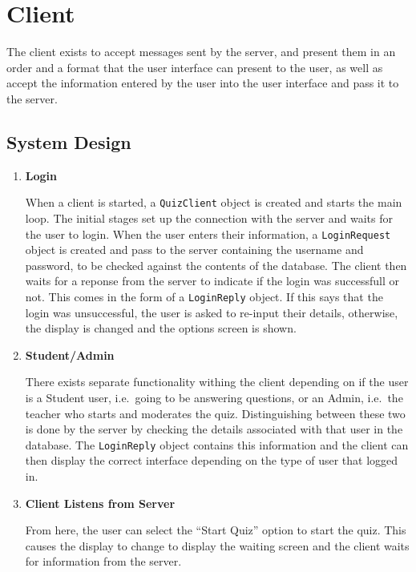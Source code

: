 \section{Client}
\label{sec:client}

The client exists to accept messages sent by the server, and present them in an
order and a format that the user interface can present to the user, as well as
accept the information entered by the user into the user interface and pass it
to the server.

\subsection{System Design}
\label{sub:client_system_design}

\begin{enumerate}

	\item \textbf{Login}

	When a client is started, a \texttt{QuizClient} object is created and
	starts the main loop.  The initial stages set up the connection with the
	server and waits for the user to login. When the user enters their
	information, a \texttt{LoginRequest} object is created and pass to the
	server containing the username and password, to be checked against the
	contents of the database. The client then waits for a reponse from the
	server to indicate if the login was successfull or not. This comes in the
	form of a \texttt{LoginReply} object. If this says that the login was
	unsuccessful, the user is asked to re-input their details, otherwise, the
	display is changed and the options screen is shown.

	\item \textbf{Student/Admin}

	There exists separate functionality withing the client depending on if the
	user is a Student user, i.e.\ going to be answering questions, or an Admin,
	i.e.\ the teacher who starts and moderates the quiz. Distinguishing between
	these two is done by the server by checking the details associated with
	that user in the database. The \texttt{LoginReply} object contains this
	information and the client can then display the correct interface depending
	on the type of user that logged in.

	\item \textbf{Client Listens from Server}

	From here, the user can select the ``Start Quiz'' option to start the
	quiz. This causes the display to change to display the waiting screen and
	the client waits for information from the server.


\end{enumerate}
